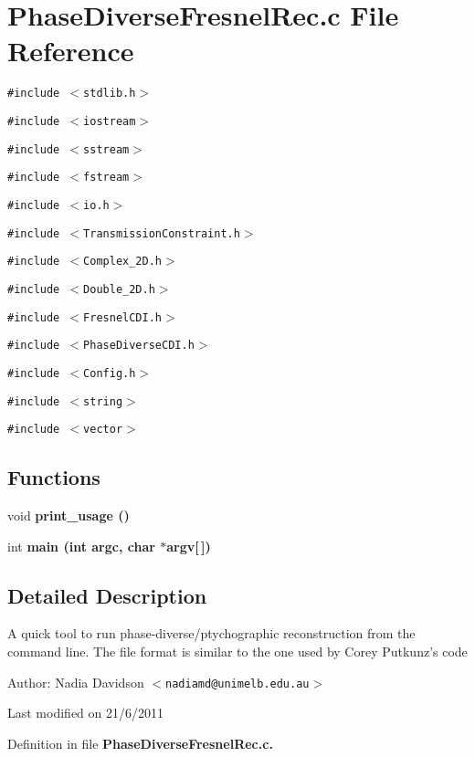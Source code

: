 \section{Phase\-Diverse\-Fresnel\-Rec.c File Reference}
\label{PhaseDiverseFresnelRec_8c}
{\tt \#include $<$stdlib.h$>$}\par
{\tt \#include $<$iostream$>$}\par
{\tt \#include $<$sstream$>$}\par
{\tt \#include $<$fstream$>$}\par
{\tt \#include $<$io.h$>$}\par
{\tt \#include $<$Transmission\-Constraint.h$>$}\par
{\tt \#include $<$Complex\_\-2D.h$>$}\par
{\tt \#include $<$Double\_\-2D.h$>$}\par
{\tt \#include $<$Fresnel\-CDI.h$>$}\par
{\tt \#include $<$Phase\-Diverse\-CDI.h$>$}\par
{\tt \#include $<$Config.h$>$}\par
{\tt \#include $<$string$>$}\par
{\tt \#include $<$vector$>$}\par
\subsection*{Functions}
\begin{CompactItemize}
\item 
void \bf{print\_\-usage} ()\label{PhaseDiverseFresnelRec_8c_1f3584ed6af78d8b74199544ff9e1096}

\item 
int \bf{main} (int argc, char $\ast$argv[$\,$])\label{PhaseDiverseFresnelRec_8c_28052c36c3b61c6c0eaa18f5d226118f}

\end{CompactItemize}


\subsection{Detailed Description}
A quick tool to run phase-diverse/ptychographic reconstruction from the command line. The file format is similar to the one used by Corey Putkunz's code

\begin{Desc}
\item[Author:]Nadia Davidson $<$\tt{nadiamd@unimelb.edu.au}$>$\end{Desc}
Last modified on 21/6/2011 

Definition in file \bf{Phase\-Diverse\-Fresnel\-Rec.c}.